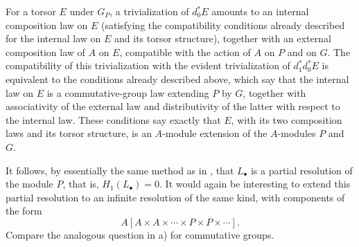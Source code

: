 For a torsor $E$ under $G_P$, a trivialization of $d_0^*E$ amounts
to an internal composition law on $E$ (satisfying the compatibility
conditions already described for the internal law on $E$ and its
torsor structure), together with an external composition law of $A$
on $E$, compatible with the action of $A$ on $P$ and on $G$.  The
compatibility of this trivialization with the evident trivialization
of $d_1^*d_0^*E$ is equivalent to the conditions already described
above, which say that the internal law on $E$ is a commutative-group
law extending $P$ by $G$, together with associativity of the external
law and distributivity of the latter with respect to the internal
law.  These conditions say exactly that $E$, with its two
composition laws and its torsor structure, is an $A$-module extension
of the $A$-modules $P$ and $G$.

It follows, by essentially the same method as in , that
$L_\bullet$ is a partial resolution of the module $P$, that is,
$H_1(L_\bullet)=0$.  It would again be interesting to extend this
partial resolution to an infinite resolution of the same kind, with
components of the form
\[
 A[A\times A\times\cdots\times P\times P\times\cdots].
\]
Compare the analogous question in a) for commutative groups.
